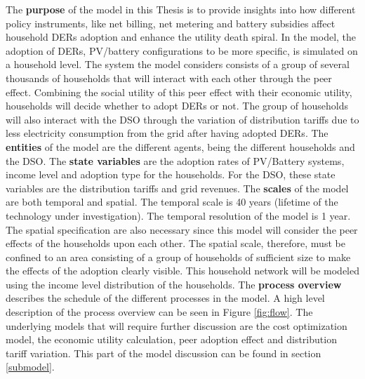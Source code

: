 The \textbf{purpose} of the model in this Thesis is to provide insights into how different policy instruments, like net billing, net metering and battery subsidies affect household DERs adoption and enhance the utility death spiral. In the model, the adoption of DERs, PV/battery configurations to be more specific, is simulated on a household level. The system the model considers consists of a group of several thousands of households that will interact with each other through the peer effect. Combining the social utility of this peer effect with their economic utility, households will decide whether to adopt DERs or not. The group of households will also interact with the DSO through the variation of distribution tariffs due to less electricity consumption from the grid after having adopted DERs.
\newline \newline \noindent
The \textbf{entities} of the model are the different agents, being the different households and the DSO. The \textbf{state variables} are the adoption rates of PV/Battery systems, income level and adoption type for the households. For the DSO, these state variables are the distribution tariffs and grid revenues. The \textbf{scales} of the model are both temporal and spatial. The temporal scale is 40 years (lifetime of the technology under investigation). The temporal resolution of the model is 1 year. The spatial specification are also necessary since this model will consider the peer effects of the households upon each other. The spatial scale, therefore, must be confined to an area consisting of a group of households of sufficient size to make the effects of the adoption clearly visible. This household network will be modeled using the income level distribution of the households. The \textbf{process overview} describes the schedule of the different processes in the model. A high level description of the process overview can be seen in Figure \ref{fig:flow}. The underlying models that will require further discussion are the cost optimization model, the economic utility calculation, peer adoption effect and distribution tariff variation. This part of the model discussion can be found in section \ref{submodel}. 
\newline 
